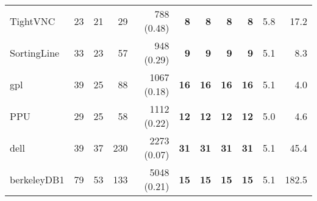 \begin{table*}
\begin{tiny}
{\begin{tabular}{lrrrrrrrrrr}
TightVNC & \num[text-series-to-math=true]{23} & \num[text-series-to-math=true]{21} & \num[text-series-to-math=true]{29} & \num[text-series-to-math=true]{788} (\num[text-series-to-math=true]{0.48}) & \textbf{\num[text-series-to-math=true]{8}} & \textbf{\num[text-series-to-math=true]{8}} & \textbf{\num[text-series-to-math=true]{8}} & \textbf{\num[text-series-to-math=true]{8}} & 5.8 & 17.2\\
SortingLine & \num[text-series-to-math=true]{33} & \num[text-series-to-math=true]{23} & \num[text-series-to-math=true]{57} & \num[text-series-to-math=true]{948} (\num[text-series-to-math=true]{0.29}) & \textbf{\num[text-series-to-math=true]{9}} & \textbf{\num[text-series-to-math=true]{9}} & \textbf{\num[text-series-to-math=true]{9}} & \textbf{\num[text-series-to-math=true]{9}} & 5.1 & 8.3\\
gpl & \num[text-series-to-math=true]{39} & \num[text-series-to-math=true]{25} & \num[text-series-to-math=true]{88} & \num[text-series-to-math=true]{1067} (\num[text-series-to-math=true]{0.18}) & \textbf{\num[text-series-to-math=true]{16}} & \textbf{\num[text-series-to-math=true]{16}} & \textbf{\num[text-series-to-math=true]{16}} & \textbf{\num[text-series-to-math=true]{16}} & 5.1 & 4.0\\
PPU & \num[text-series-to-math=true]{29} & \num[text-series-to-math=true]{25} & \num[text-series-to-math=true]{58} & \num[text-series-to-math=true]{1112} (\num[text-series-to-math=true]{0.22}) & \textbf{\num[text-series-to-math=true]{12}} & \textbf{\num[text-series-to-math=true]{12}} & \textbf{\num[text-series-to-math=true]{12}} & \textbf{\num[text-series-to-math=true]{12}} & 5.0 & 4.6\\
dell & \num[text-series-to-math=true]{39} & \num[text-series-to-math=true]{37} & \num[text-series-to-math=true]{230} & \num[text-series-to-math=true]{2273} (\num[text-series-to-math=true]{0.07}) & \textbf{\num[text-series-to-math=true]{31}} & \textbf{\num[text-series-to-math=true]{31}} & \textbf{\num[text-series-to-math=true]{31}} & \textbf{\num[text-series-to-math=true]{31}} & 5.1 & 45.4\\
berkeleyDB1 & \num[text-series-to-math=true]{79} & \num[text-series-to-math=true]{53} & \num[text-series-to-math=true]{133} & \num[text-series-to-math=true]{5048} (\num[text-series-to-math=true]{0.21}) & \textbf{\num[text-series-to-math=true]{15}} & \textbf{\num[text-series-to-math=true]{15}} & \textbf{\num[text-series-to-math=true]{15}} & \textbf{\num[text-series-to-math=true]{15}} & 5.1 & 182.5\\

\end{tabular}}
\end{tiny}
\end{table*}
